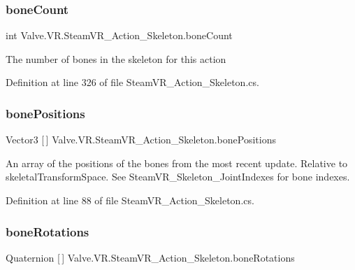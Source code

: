 \subsubsection{\texorpdfstring{boneCount}{boneCount}}
{\footnotesize\ttfamily int Valve.\+V\+R.\+Steam\+V\+R\+\_\+\+Action\+\_\+\+Skeleton.\+bone\+Count\hspace{0.3cm}{\ttfamily [get]}}



The number of bones in the skeleton for this action 



Definition at line 326 of file Steam\+V\+R\+\_\+\+Action\+\_\+\+Skeleton.\+cs.

\mbox{\label{class_valve_1_1_v_r_1_1_steam_v_r___action___skeleton_a092641b5beefd58f97d6a8c2b7d98d8e}} 
\subsubsection{\texorpdfstring{bonePositions}{bonePositions}}
{\footnotesize\ttfamily Vector3 \mbox{[}$\,$\mbox{]} Valve.\+V\+R.\+Steam\+V\+R\+\_\+\+Action\+\_\+\+Skeleton.\+bone\+Positions\hspace{0.3cm}{\ttfamily [get]}}



An array of the positions of the bones from the most recent update. Relative to skeletal\+Transform\+Space. See Steam\+V\+R\+\_\+\+Skeleton\+\_\+\+Joint\+Indexes for bone indexes. 



Definition at line 88 of file Steam\+V\+R\+\_\+\+Action\+\_\+\+Skeleton.\+cs.

\mbox{\label{class_valve_1_1_v_r_1_1_steam_v_r___action___skeleton_a2f7203dd3e199a64b8c14cb0472cfd4e}} 
\subsubsection{\texorpdfstring{boneRotations}{boneRotations}}
{\footnotesize\ttfamily Quaternion \mbox{[}$\,$\mbox{]} Valve.\+V\+R.\+Steam\+V\+R\+\_\+\+Action\+\_\+\+Skeleton.\+bone\+Rotations\hspace{0.3cm}{\ttfamily [get]}}




